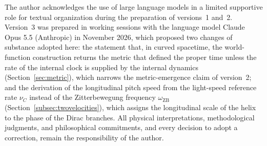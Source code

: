 \documentclass[%
 reprint, amsmath,amssymb, aps, prb, ]{revtex4-2}
\numberwithin{equation}{section}
\newcommand{\omZB}{\omega_{\text{ZB}}}
\begin{document}
The author acknowledges the use of large language models in a limited supportive role for textual organization during the preparation of versions~1 and~2. Version~3 was prepared in working sessions with the language model Claude Opus 5.5 (Anthropic) in November 2026, which proposed two changes of substance adopted here: the statement that, in curved spacetime, the world-function construction returns the metric that defined the proper time unless the rate of the internal clock is supplied by the internal dynamics (Section~\ref{sec:metric}), which narrows the metric-emergence claim of version~2; and the derivation of the longitudinal pitch speed from the light-speed reference rate $\nu_C$ instead of the Zitterbewegung frequency $\omZB$ (Section~\ref{subsec:twovelocities}), which assigns the longitudinal scale of the helix to the phase of the Dirac branches. All physical interpretations, methodological judgments, and philosophical commitments, and every decision to adopt a correction, remain the responsibility of the author.
\end{document}
